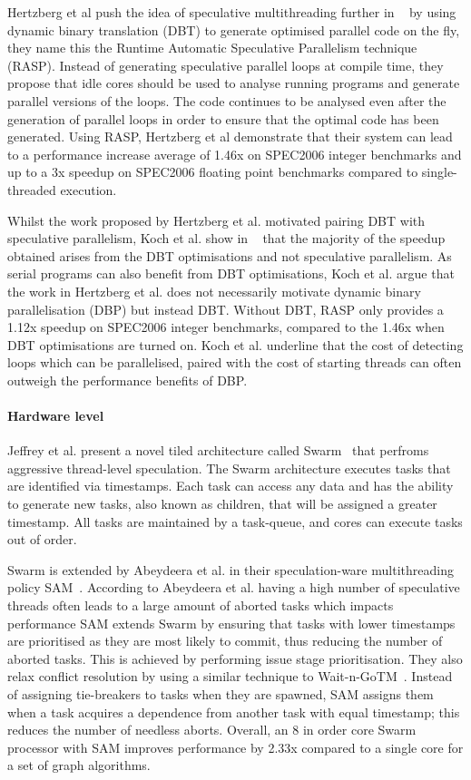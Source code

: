 Hertzberg et al push the idea of speculative multithreading further in ~\cite{dbtspec2011} by using dynamic binary translation (DBT) to generate optimised parallel code on the fly, they name this the Runtime Automatic Speculative Parallelism technique (RASP).
Instead of generating speculative parallel loops at compile time, they propose that idle cores should be used to analyse running programs and generate parallel versions of the loops.
The code continues to be analysed even after the generation of parallel loops in order to ensure that the optimal code has been generated.
Using RASP, Hertzberg et al demonstrate that their system can lead to a performance increase average of 1.46x on SPEC2006 integer benchmarks and up to a 3x speedup on SPEC2006 floating point benchmarks compared to single-threaded execution.

Whilst the work proposed by Hertzberg et al. motivated pairing DBT with speculative parallelism, Koch et al. show in ~\cite{koch2013spec} that the majority of the speedup obtained arises from the DBT optimisations and not speculative parallelism.
As serial programs can also benefit from DBT optimisations, Koch et al. argue that the work in Hertzberg et al. does not necessarily motivate dynamic binary parallelisation (DBP) but instead DBT.
Without DBT, RASP only provides a 1.12x speedup on SPEC2006 integer benchmarks, compared to the 1.46x when DBT optimisations are turned on.
Koch et al. underline that the cost of detecting loops which can be parallelised, paired with the cost of starting threads can often outweigh the performance benefits of DBP.
 
\paragraph*{Hardware level}
Jeffrey et al. present a novel tiled architecture called Swarm~\cite{swarm2016} that perfroms aggressive thread-level speculation.
The Swarm architecture executes tasks that are identified via timestamps.
Each task can access any data and has the ability to generate new tasks, also known as children, that will be assigned a greater timestamp.
All tasks are maintained by a task-queue, and cores can execute tasks out of order.

Swarm is extended by Abeydeera et al. in their speculation-ware multithreading policy SAM~\cite{Abeydeera2017SpecMulti}.
According to Abeydeera et al. having a high number of speculative threads often leads to a large amount of aborted tasks which impacts performance
SAM extends Swarm by ensuring that tasks with lower timestamps are prioritised as they are most likely to commit, thus reducing the number of aborted tasks.
This is achieved by performing issue stage prioritisation.
They also relax conflict resolution by using a similar technique to Wait-n-GoTM~\cite{waitNGo2013}.
Instead of assigning tie-breakers to tasks when they are spawned, SAM assigns them when a task acquires a dependence from another task with equal timestamp; this reduces the number of needless aborts.
Overall, an 8 in order core Swarm processor with SAM improves performance by 2.33x compared to a single core for a set of graph algorithms.

